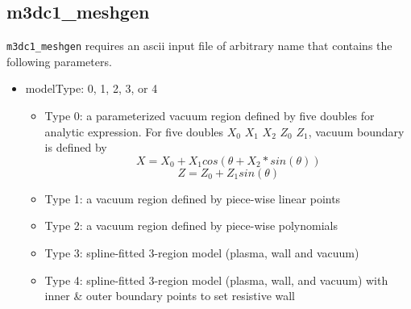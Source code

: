 \subsection{m3dc1\_meshgen}
\label{ch:mesh-gen}

\texttt{m3dc1\_meshgen} requires an ascii input file of arbitrary name that contains the following parameters.

\begin{itemize}
\item modelType: 0, 1, 2, 3, or 4
\begin{itemize}
\item Type 0: a parameterized vacuum region defined by five doubles for analytic expression. 
For five doubles $X_0$   $X_1$   $X_2$   $Z_0$   $Z_1$, vacuum boundary is defined by 
\begin{equation}
X = X_0 + X_1 cos(\theta + X_2*sin(\theta))
\end{equation}
\begin{equation}
Z =  Z_0 + Z_1 sin(\theta)
\end{equation}
\item	Type 1: a vacuum region defined by piece-wise linear points
\item	Type 2: a vacuum region defined by piece-wise polynomials
\item	Type 3: spline-fitted 3-region model (plasma, wall and vacuum)
\item	Type 4: spline-fitted 3-region model (plasma, wall, and vacuum) with inner \& outer boundary points to set resistive wall
\end{itemize}


\end{itemize}
